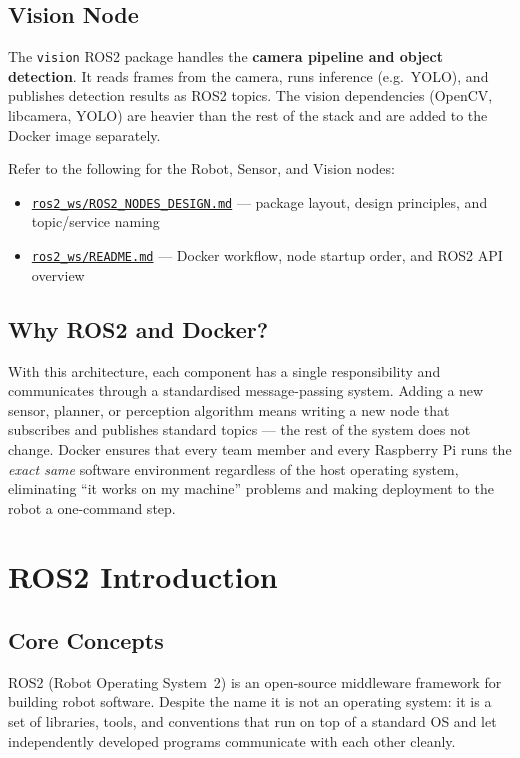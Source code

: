 \documentclass{ol-softwaremanual}
\newcommand{\doclink}[2]{\href{#1}{#2}}
\begin{document}
\subsection*{Vision Node}
The \texttt{vision} ROS2 package handles the \textbf{camera pipeline and object detection}.
It reads frames from the camera, runs inference (e.g.\ YOLO), and publishes detection results
as ROS2 topics.
The vision dependencies (OpenCV, libcamera, YOLO) are heavier than the rest of the stack
and are added to the Docker image separately.

Refer to the following for the Robot, Sensor, and Vision nodes:
\begin{itemize}
  \item \doclink{https://github.com/pochihh/Project-NUEVO/blob/main/ros2_ws/ROS2_NODES_DESIGN.md}{\texttt{ros2\_ws/ROS2\_NODES\_DESIGN.md}} --- package layout, design principles, and topic/service naming
  \item \doclink{https://github.com/pochihh/Project-NUEVO/blob/main/ros2_ws/README.md}{\texttt{ros2\_ws/README.md}} --- Docker workflow, node startup order, and ROS2 API overview
\end{itemize}

\subsection*{Why ROS2 and Docker?}
With this architecture, each component has a single responsibility and communicates
through a standardised message-passing system.
Adding a new sensor, planner, or perception algorithm means writing a new node
that subscribes and publishes standard topics --- the rest of the system does not change.
Docker ensures that every team member and every Raspberry Pi runs the \emph{exact same}
software environment regardless of the host operating system, eliminating
``it works on my machine'' problems and making deployment to the robot a one-command step.


\section{ROS2 Introduction}

\subsection{Core Concepts}

ROS2 (Robot Operating System~2) is an open-source middleware framework for building
robot software.
Despite the name it is not an operating system: it is a set of libraries, tools, and
conventions that run on top of a standard OS and let independently developed programs
communicate with each other cleanly.
\end{document}
